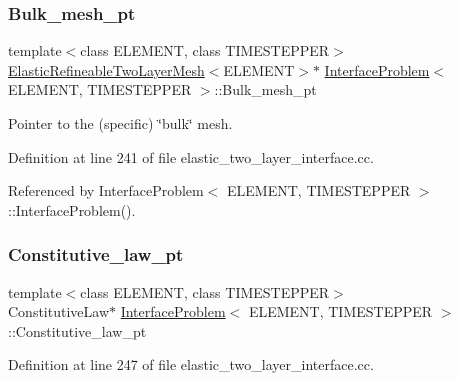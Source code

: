 \subsubsection{\texorpdfstring{Bulk\+\_\+mesh\+\_\+pt}{Bulk\_mesh\_pt}\hspace{0.1cm}{\footnotesize\ttfamily [2/2]}}
{\footnotesize\ttfamily template$<$class E\+L\+E\+M\+E\+NT, class T\+I\+M\+E\+S\+T\+E\+P\+P\+ER$>$ \\
\hyperlink{classElasticRefineableTwoLayerMesh}{Elastic\+Refineable\+Two\+Layer\+Mesh}$<$E\+L\+E\+M\+E\+NT$>$$\ast$ \hyperlink{classInterfaceProblem}{Interface\+Problem}$<$ E\+L\+E\+M\+E\+NT, T\+I\+M\+E\+S\+T\+E\+P\+P\+ER $>$\+::Bulk\+\_\+mesh\+\_\+pt\hspace{0.3cm}{\ttfamily [private]}}



Pointer to the (specific) \char`\"{}bulk\char`\"{} mesh. 



Definition at line 241 of file elastic\+\_\+two\+\_\+layer\+\_\+interface.\+cc.



Referenced by Interface\+Problem$<$ E\+L\+E\+M\+E\+N\+T, T\+I\+M\+E\+S\+T\+E\+P\+P\+E\+R $>$\+::\+Interface\+Problem().

\mbox{\label{classInterfaceProblem_a5bf645cbdbf7775ab6438be324caf3c3}} 
\subsubsection{\texorpdfstring{Constitutive\+\_\+law\+\_\+pt}{Constitutive\_law\_pt}}
{\footnotesize\ttfamily template$<$class E\+L\+E\+M\+E\+NT, class T\+I\+M\+E\+S\+T\+E\+P\+P\+ER$>$ \\
Constitutive\+Law$\ast$ \hyperlink{classInterfaceProblem}{Interface\+Problem}$<$ E\+L\+E\+M\+E\+NT, T\+I\+M\+E\+S\+T\+E\+P\+P\+ER $>$\+::Constitutive\+\_\+law\+\_\+pt\hspace{0.3cm}{\ttfamily [private]}}



Definition at line 247 of file elastic\+\_\+two\+\_\+layer\+\_\+interface.\+cc.

\mbox{\label{classInterfaceProblem_a9b5070b479a79546b983bd7027917e93}} 
